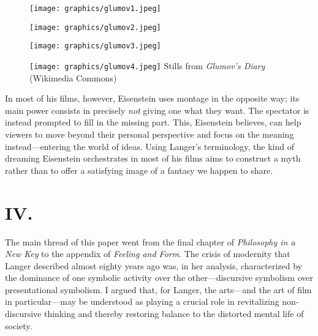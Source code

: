 \documentclass{tufte-handout}
\begin{document}
\vspace{.3in}

\begin{figure}
    \centering
    \texttt{[image: graphics/glumov1.jpeg]}
    \label{fig:one}
\end{figure}

\begin{figure}
    \centering
    \texttt{[image: graphics/glumov2.jpeg]}
    \label{fig:two}
\end{figure}

\begin{figure}
    \centering
    \texttt{[image: graphics/glumov3.jpeg]}
    \label{fig:three}
\end{figure}

\begin{figure}
    \centering
    \texttt{[image: graphics/glumov4.jpeg]}
    \label{fig:four}
    \vspace{.2in}
    \noindent\small{Stills from \emph{Glumov's Diary} (Wikimedia Commons)}
\end{figure}




\newpage In most of his films, however, Eisenstein uses montage in the opposite
way; its main power consists in precisely \emph{not} giving one what
they want. The spectator is instead prompted to fill in the missing
part. This, Eisenstein believes, can help viewers to move beyond their
personal perspective and focus on the meaning instead---entering the
world of ideas. Using Langer's terminology, the kind of dreaming
Eisenstein orchestrates in most of his films aims to construct a myth
rather than to offer a satisfying image of a fantasy we happen to share.

\hypertarget{iv}{%
\section{IV.}\label{iv}}

The main thread of this paper went from the final chapter of
\emph{Philosophy in a New Key} to the appendix of \emph{Feeling and
Form}. The crisis of modernity that Langer described almost eighty years
ago was, in her analysis, characterized by the dominance of one symbolic
activity over the other---discursive symbolism over presentational
symbolism. I argued that, for Langer, the arts---and the art of film in
particular---may be understood as playing a crucial role in revitalizing
non-discursive thinking and thereby restoring balance to the distorted
mental life of society.
\end{document}

